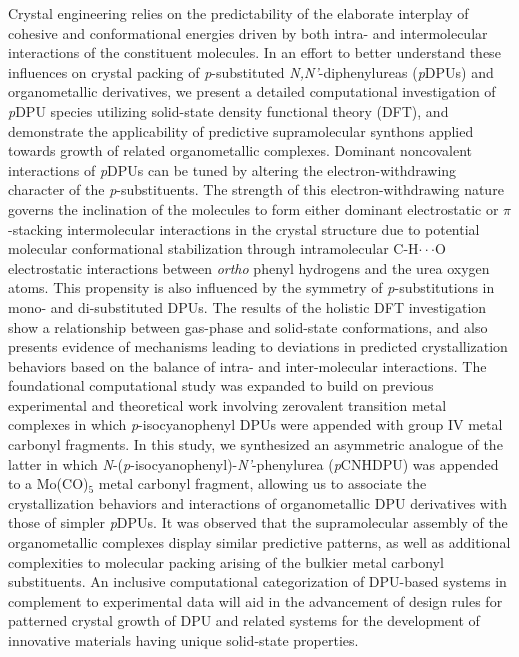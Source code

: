 Crystal engineering relies on the predictability of the elaborate interplay of cohesive and conformational energies driven by both intra- and intermolecular interactions of the constituent molecules. In an effort to better understand these influences on crystal packing of \textit{p}-substituted \textit{N,N'}-diphenylureas (\textit{p}DPUs) and organometallic derivatives, we present a detailed computational investigation of \textit{p}DPU species utilizing solid-state density functional theory (DFT), and demonstrate the applicability of predictive supramolecular synthons applied towards growth of related organometallic complexes. Dominant noncovalent interactions of \textit{p}DPUs can be tuned by altering the electron-withdrawing character of the \textit{p}-substituents. The strength of this electron-withdrawing nature governs the inclination of the molecules to form either dominant electrostatic or $\pi$-stacking intermolecular interactions in the crystal structure due to potential molecular conformational stabilization through intramolecular C-H$\cdot \cdot \cdot$O electrostatic interactions between \textit{ortho} phenyl hydrogens and the urea oxygen atoms. This propensity is also influenced by the symmetry of \textit{p}-substitutions in mono- and di-substituted DPUs. The results of the holistic DFT investigation show a relationship between gas-phase and solid-state conformations, and also presents evidence of mechanisms leading to deviations in predicted crystallization behaviors based on the balance of intra- and inter-molecular interactions. The foundational computational study was expanded to build on previous experimental and theoretical work involving zerovalent transition metal complexes in which \textit{p}-isocyanophenyl DPUs were appended with group IV metal carbonyl fragments. In this study, we synthesized an asymmetric analogue of the latter in which \textit{N}-(\textit{p}-isocyanophenyl)-\textit{N'}-phenylurea (\textit{p}CNHDPU) was appended to a Mo(CO)$_{5}$ metal carbonyl fragment, allowing us to associate the crystallization behaviors and interactions of organometallic DPU derivatives with those of simpler \textit{p}DPUs. It was observed that the supramolecular assembly of the organometallic complexes display similar predictive patterns, as well as additional complexities to molecular packing arising of the bulkier metal carbonyl substituents. An inclusive computational categorization of DPU-based systems in complement to experimental data will aid in the advancement of design rules for patterned crystal growth of DPU and related systems for the development of innovative materials having unique solid-state properties.

